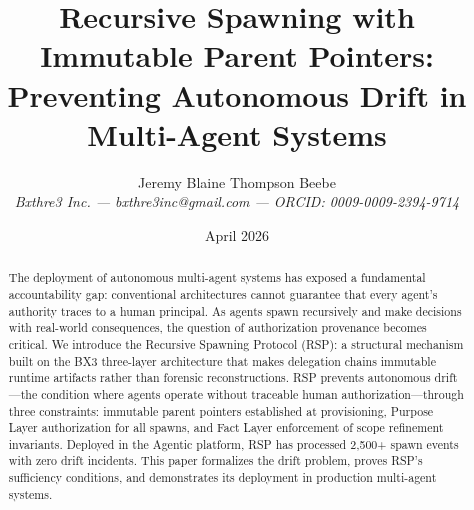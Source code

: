 \documentclass[12pt]{article}
\title{Recursive Spawning with Immutable Parent Pointers: Preventing Autonomous Drift in Multi-Agent Systems}
\author{Jeremy Blaine Thompson Beebe\\ \textit{Bxthre3 Inc. --- bxthre3inc@gmail.com --- ORCID: 0009-0009-2394-9714}}
\date{April 2026}
\begin{document}
\maketitle

\begin{abstract}
The deployment of autonomous multi-agent systems has exposed a fundamental accountability gap: conventional architectures cannot guarantee that every agent's authority traces to a human principal. As agents spawn recursively and make decisions with real-world consequences, the question of authorization provenance becomes critical. We introduce the Recursive Spawning Protocol (RSP): a structural mechanism built on the BX3 three-layer architecture that makes delegation chains immutable runtime artifacts rather than forensic reconstructions. RSP prevents autonomous drift—the condition where agents operate without traceable human authorization—through three constraints: immutable parent pointers established at provisioning, Purpose Layer authorization for all spawns, and Fact Layer enforcement of scope refinement invariants. Deployed in the Agentic platform, RSP has processed 2,500+ spawn events with zero drift incidents. This paper formalizes the drift problem, proves RSP's sufficiency conditions, and demonstrates its deployment in production multi-agent systems.
\end{abstract}





















\end{document}
